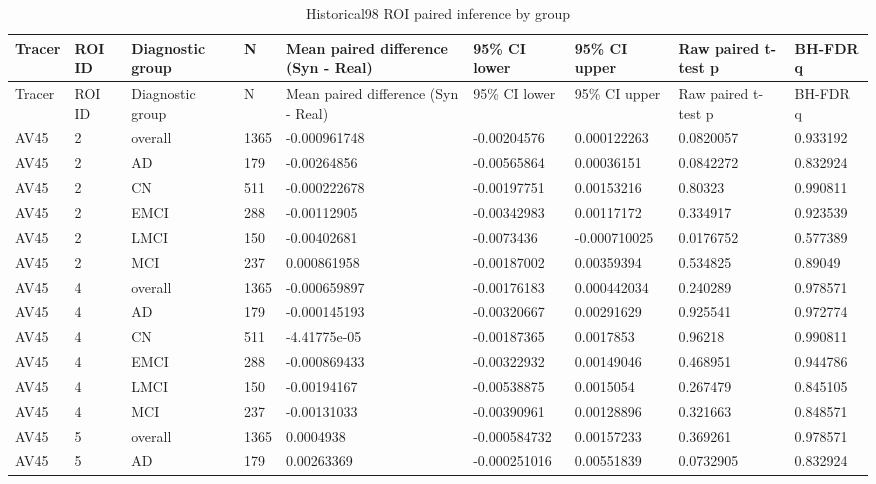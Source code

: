 \begin{landscape}
\begingroup
\footnotesize
\setlength{\tabcolsep}{4pt}
\begin{longtable}{lllllllll}
\caption{Historical98 ROI paired inference by group}\label{tab:s-n07}\\
\toprule
Tracer & ROI ID & Diagnostic group & N & Mean paired difference (Syn - Real) & 95\% CI lower & 95\% CI upper & Raw paired t-test p & BH-FDR q \\
\midrule
\endfirsthead
\toprule
Tracer & ROI ID & Diagnostic group & N & Mean paired difference (Syn - Real) & 95\% CI lower & 95\% CI upper & Raw paired t-test p & BH-FDR q \\
\midrule
\endhead
\bottomrule
\endfoot
AV45 & 2 & overall & 1365 & -0.000961748 & -0.00204576 & 0.000122263 & 0.0820057 & 0.933192 \\
AV45 & 2 & AD & 179 & -0.00264856 & -0.00565864 & 0.00036151 & 0.0842272 & 0.832924 \\
AV45 & 2 & CN & 511 & -0.000222678 & -0.00197751 & 0.00153216 & 0.80323 & 0.990811 \\
AV45 & 2 & EMCI & 288 & -0.00112905 & -0.00342983 & 0.00117172 & 0.334917 & 0.923539 \\
AV45 & 2 & LMCI & 150 & -0.00402681 & -0.0073436 & -0.000710025 & 0.0176752 & 0.577389 \\
AV45 & 2 & MCI & 237 & 0.000861958 & -0.00187002 & 0.00359394 & 0.534825 & 0.89049 \\
AV45 & 4 & overall & 1365 & -0.000659897 & -0.00176183 & 0.000442034 & 0.240289 & 0.978571 \\
AV45 & 4 & AD & 179 & -0.000145193 & -0.00320667 & 0.00291629 & 0.925541 & 0.972774 \\
AV45 & 4 & CN & 511 & -4.41775e-05 & -0.00187365 & 0.0017853 & 0.96218 & 0.990811 \\
AV45 & 4 & EMCI & 288 & -0.000869433 & -0.00322932 & 0.00149046 & 0.468951 & 0.944786 \\
AV45 & 4 & LMCI & 150 & -0.00194167 & -0.00538875 & 0.0015054 & 0.267479 & 0.845105 \\
AV45 & 4 & MCI & 237 & -0.00131033 & -0.00390961 & 0.00128896 & 0.321663 & 0.848571 \\
AV45 & 5 & overall & 1365 & 0.0004938 & -0.000584732 & 0.00157233 & 0.369261 & 0.978571 \\
AV45 & 5 & AD & 179 & 0.00263369 & -0.000251016 & 0.00551839 & 0.0732905 & 0.832924 \\

\end{longtable}
\end{landscape}

